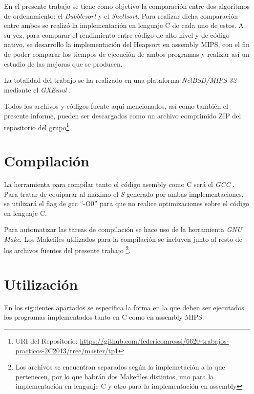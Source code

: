 \documentclass{article}
\begin{document}
	En el presente trabajo se tiene como objetivo la comparación entre dos algoritmos de ordenamiento: el \textit{Bubblesort} y el \textit{Shellsort}.
	Para realizar dicha comparación entre ambos se realizó la implementación en lenguaje C de cada uno de estos. A su vez, para comparar el rendimiento entre código de alto nivel y de código nativo, se desarrollo la implementación del Heapsort en assembly MIPS, con el fin de poder comparar los tiempos de ejecución de ambos programas y realizar así un estudio de las mejoras que se producen.
	\par
	La totalidad del trabajo se ha realizado en una plataforma \textit{NetBSD/MIPS-32} mediante el \textit{GXEmul} \cite{GXEMUL}.
	\par
	Todos los archivos y códigos fuente aquí mencionados, así como también el presente informe, pueden ser descargados como un archivo comprimido ZIP del repositorio del grupo\footnote{URI del Repositorio: \url{https://github.com/federicomrossi/6620-trabajos-practicos-2C2013/tree/master/tp1}}.
\bigskip




\section{Compilación}
	
	
	La herramienta para compilar tanto el código asembly como C será el \textit{GCC} \cite{GCC}. Para tratar de equiparar al máximo el \textit{S} generado por ambas implementaciones, se utilizará el flag de gcc ``-O0'' para que no realice optimizaciones sobre el código en lenguaje C.
	\par
	Para automatizar las tareas de compilación se hace uso de la herramienta \textit{GNU Make}. Los Makefiles utilizados para la compilación se incluyen junto al resto de los archivos fuentes del presente trabajo \footnote{Los archivos se encuentran separados según la implemetación a la que pertenecen, por lo que habrán dos Makefiles distintos, uno para la implementación en lenguaje C y otro para la implementación en assembly}.
\bigskip




\section{Utilización}
	
	En los siguientes apartados se especifica la forma en la que deben ser ejecutados los programas implementados tanto en C como en assembly MIPS.
\end{document}
